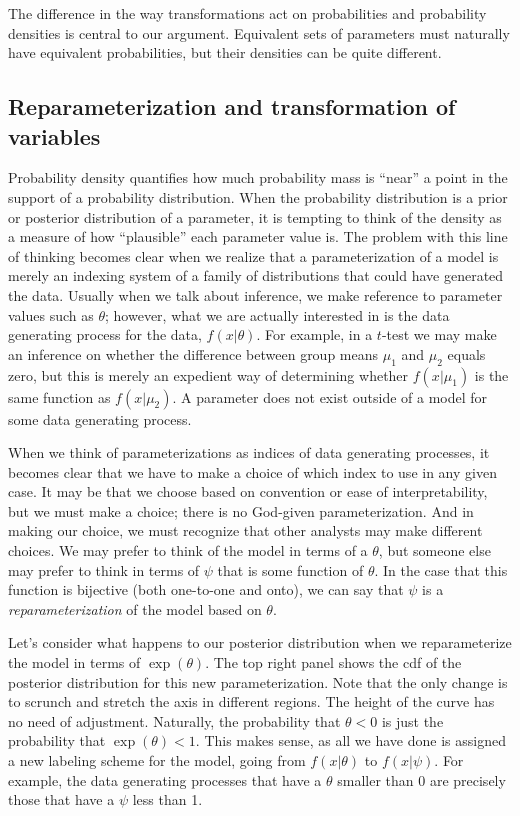 \documentclass[man]{apa}
\begin{document}
The difference in the way transformations act on probabilities and probability densities is central to our argument. Equivalent sets of parameters must naturally have equivalent probabilities, but their densities can be quite different.

    
   \subsection*{Reparameterization and transformation of variables}
Probability density quantifies how much probability mass is ``near'' a point in the support of a probability distribution. When the probability distribution is a prior or posterior distribution of a parameter, it is tempting to think of the density as a measure of how ``plausible'' each parameter value is. The problem with this line of thinking becomes clear when we realize that a parameterization of a model is merely an indexing system of a family of distributions that could have generated the data. Usually when we talk about inference, we make reference to parameter values such as $\theta$; however, what we are actually interested in is the data generating process for the data, $f(x|\theta)$. For example, in a $t$-test we may make an inference on whether the difference between group means $\mu_1$ and $\mu_2$ equals zero, but this is merely an expedient way of determining whether $f(x|\mu_1)$ is the same function as $f(x|\mu_2)$. A parameter does not exist outside of a model for some data generating process. 

When we think of parameterizations as indices of data generating processes, it becomes clear that we have to make a choice of which index to use in any given case. It may be that we choose based on convention or ease of interpretability, but we must make a choice; there is no God-given parameterization. And in making our choice, we must recognize that other analysts may make different choices. We may prefer to think of the model in terms of a $\theta$, but someone else may prefer to think in terms of $\psi$ that is some function of $\theta$. In the case that this function is bijective (both one-to-one and onto), we can say that $\psi$ is a \textit{reparameterization} of the model based on $\theta$. 

Let's consider what happens to our posterior distribution when we reparameterize the model in terms of $\exp{(\theta)}$. 
The top right panel shows the cdf of the posterior distribution for this new parameterization. Note that the only change is to scrunch and stretch the axis in different regions. 
The height of the curve has no need of adjustment. Naturally, the probability that $\theta<0$ is just the probability that $\exp{(\theta)}<1$. This makes sense, as all we have done is assigned a new labeling scheme for the model, going from $f(x|\theta)$ to $f(x|\psi)$.
For example, the data generating processes that have a $\theta$ smaller than 0 are precisely those that have a $\psi$ less than 1. 
 
\end{document}
